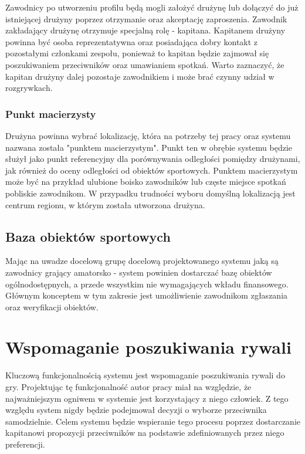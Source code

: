 Zawodnicy po utworzeniu profilu będą mogli założyć drużynę lub dołączyć do już istniejącej drużyny poprzez otrzymanie oraz akceptację zaproszenia. Zawodnik zakładający drużynę otrzymuje specjalną rolę - kapitana. Kapitanem drużyny powinna być osoba reprezentatywna oraz posiadająca dobry kontakt z pozostałymi członkami zespołu, ponieważ to kapitan będzie zajmował się poszukiwaniem przeciwników oraz umawianiem spotkań. Warto zaznaczyć, że kapitan drużyny dalej pozostaje zawodnikiem i może brać czynny udział w rozgrywkach. 

\subsubsection{Punkt macierzysty}

Drużyna powinna wybrać lokalizację, która na potrzeby tej pracy oraz systemu nazwana została "punktem macierzystym". Punkt ten w obrębie systemu będzie służył jako punkt referencyjny dla porównywania odległości pomiędzy drużynami, jak również do oceny odległości od obiektów sportowych. Punktem macierzystym może być na przykład ulubione boisko zawodników lub częste miejsce spotkań pobliskie zawodnikom. W przypadku trudności wyboru domyślną lokalizacją jest centrum regionu, w którym została utworzona drużyna.

\subsection{Baza obiektów sportowych}

Mając na uwadze docelową grupę docelową projektowanego systemu jaką są zawodnicy grający amatorsko - system powinien dostarczać bazę obiektów ogólnodostępnych, a przede wszystkim nie wymagających wkładu finansowego. Głównym konceptem w tym zakresie jest umożliwienie zawodnikom zgłaszania oraz weryfikacji obiektów. 

\section{Wspomaganie poszukiwania rywali}

Kluczową funkcjonalnością systemu jest wspomaganie poszukiwania rywali do gry. Projektując tę funkcjonalność autor pracy miał na względzie, że najważniejszym ogniwem w systemie jest korzystający z niego człowiek. Z tego względu system nigdy będzie podejmował decyzji o wyborze przeciwnika samodzielnie. Celem systemu będzie wspieranie tego procesu poprzez dostarczanie kapitanowi propozycji przeciwników na podstawie zdefiniowanych przez niego preferencji.



